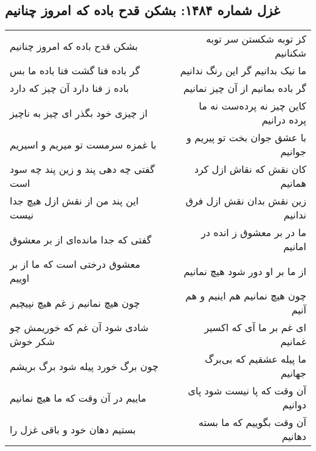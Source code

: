 \begin{center}
\section*{غزل شماره ۱۴۸۴: بشکن قدح باده که امروز چنانیم}
\label{sec:1484}
\begin{longtable}{l p{0.5cm} r}
بشکن قدح باده که امروز چنانیم
&&
کز توبه شکستن سر توبه شکنانیم
\\
گر باده فنا گشت فنا باده ما بس
&&
ما نیک بدانیم گر این رنگ ندانیم
\\
باده ز فنا دارد آن چیز که دارد
&&
گر باده بمانیم از آن چیز نمانیم
\\
از چیزی خود بگذر ای چیز به ناچیز
&&
کاین چیز نه پرده‌ست نه ما پرده درانیم
\\
با غمزه سرمست تو میریم و اسیریم
&&
با عشق جوان بخت تو پیریم و جوانیم
\\
گفتی چه دهی پند و زین پند چه سود است
&&
کان نقش که نقاش ازل کرد همانیم
\\
این پند من از نقش ازل هیچ جدا نیست
&&
زین نقش بدان نقش ازل فرق ندانیم
\\
گفتی که جدا مانده‌ای از بر معشوق
&&
ما در بر معشوق ز انده در امانیم
\\
معشوق درختی است که ما از بر اوییم
&&
از ما بر او دور شود هیچ نمانیم
\\
چون هیچ نمانیم ز غم هیچ نپیچیم
&&
چون هیچ نمانیم هم اینیم و هم آنیم
\\
شادی شود آن غم که خوریمش چو شکر خوش
&&
ای غم بر ما آی که اکسیر غمانیم
\\
چون برگ خورد پیله شود برگ بریشم
&&
ما پیله عشقیم که بی‌برگ جهانیم
\\
ماییم در آن وقت که ما هیچ نمانیم
&&
آن وقت که پا نیست شود پای دوانیم
\\
بستیم دهان خود و باقی غزل را
&&
آن وقت بگوییم که ما بسته دهانیم
\\
\end{longtable}
\end{center}
